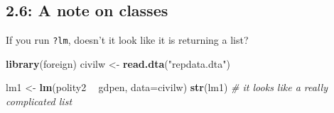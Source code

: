 \documentclass[]{article}
\newenvironment{Shaded}{\begin{snugshade}}{\end{snugshade}}
\newcommand{\KeywordTok}[1]{\textcolor[rgb]{0.13,0.29,0.53}{\textbf{#1}}}
\newcommand{\DataTypeTok}[1]{\textcolor[rgb]{0.13,0.29,0.53}{#1}}
\newcommand{\StringTok}[1]{\textcolor[rgb]{0.31,0.60,0.02}{#1}}
\newcommand{\CommentTok}[1]{\textcolor[rgb]{0.56,0.35,0.01}{\textit{#1}}}
\newcommand{\OperatorTok}[1]{\textcolor[rgb]{0.81,0.36,0.00}{\textbf{#1}}}
\newcommand{\NormalTok}[1]{#1}
\begin{document}
\subsection{2.6: A note on classes}\label{a-note-on-classes}

If you run \texttt{?lm}, doesn't it look like it is returning a list?

\begin{Shaded}
\begin{Highlighting}[]
\KeywordTok{library}\NormalTok{(foreign)}
\NormalTok{civilw <-}\StringTok{ }\KeywordTok{read.dta}\NormalTok{(}\StringTok{"repdata.dta"}\NormalTok{)}

\NormalTok{lm1 <-}\StringTok{ }\KeywordTok{lm}\NormalTok{(polity2 }\OperatorTok{~}\StringTok{ }\NormalTok{gdpen, }\DataTypeTok{data=}\NormalTok{civilw)}
\KeywordTok{str}\NormalTok{(lm1) }\CommentTok{# it looks like a really complicated list}
\end{Highlighting}
\end{Shaded}
\end{document}
